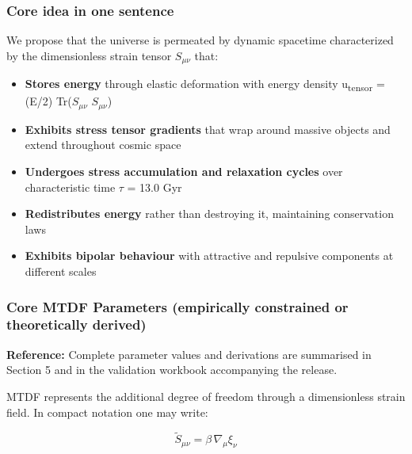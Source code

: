 \documentclass[11pt,a4paper]{article}
\begin{document}
\begin{mdframed}[linecolor=accent,linewidth=0.5pt,backgroundcolor=callout-bg,leftline=true,rightline=true,topline=true,bottomline=true,innerleftmargin=8pt,innerrightmargin=8pt,innertopmargin=6pt,innerbottommargin=6pt]
\subsubsection{Core idea in one sentence}
We propose that the universe is permeated by dynamic spacetime characterized by the dimensionless strain tensor $S_{\mu\nu}$ that:

\begin{itemize}
  \item \textbf{Stores energy} through elastic deformation with energy density u\textsubscript{tensor} = (E/\allowbreak{}2) Tr($S_{\mu\nu}$ $S_{\mu\nu}$)
  \item \textbf{Exhibits stress tensor gradients} that wrap around massive objects and extend throughout cosmic space
  \item \textbf{Undergoes stress accumulation and relaxation cycles} over characteristic time $\tau$ = 13.0 Gyr
  \item \textbf{Redistributes energy} rather than destroying it, maintaining conservation laws
  \item \textbf{Exhibits bipolar behaviour} with attractive and repulsive components at different scales
\end{itemize}

\begin{mdframed}[linecolor=accent,linewidth=0.5pt,backgroundcolor=callout-bg,leftline=true,rightline=true,topline=true,bottomline=true,innerleftmargin=8pt,innerrightmargin=8pt,innertopmargin=6pt,innerbottommargin=6pt]
\subsubsection{Core MTDF Parameters (empirically constrained or theoretically derived)}
\textbf{Reference:} Complete parameter values and derivations are summarised in Section 5 and in the validation workbook accompanying the release.
\end{mdframed}
\end{mdframed}

MTDF represents the additional degree of freedom through a dimensionless strain field. In compact notation one may write:

\[
\tilde{S}_{\mu\nu} = \beta\,\nabla_\mu \xi_\nu
\]
\end{document}
